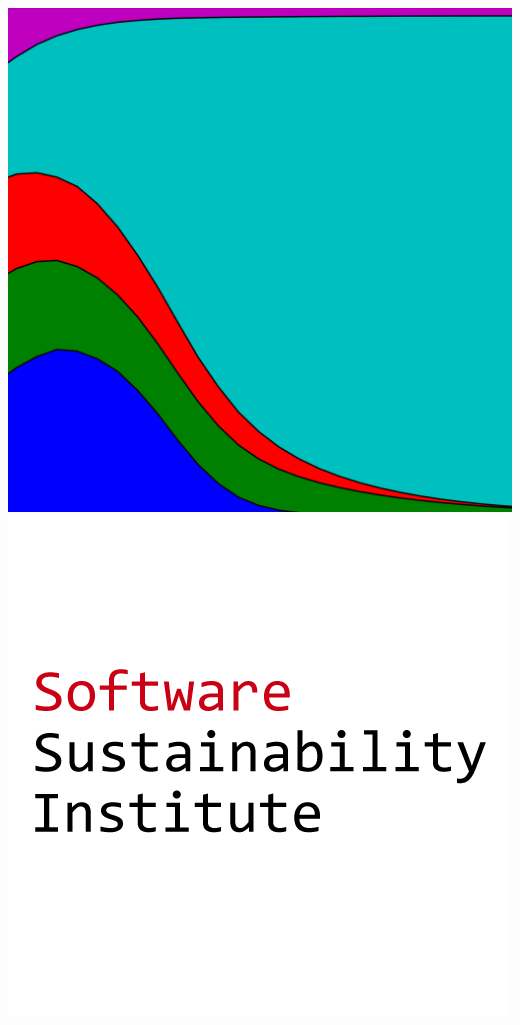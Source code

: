 \documentclass{beamer}
\begin{document}
\begin{frame}
        \includegraphics[height=.4\textheight]{static/axelrod_logo.png}
        \hfill
        \includegraphics[height=.4\textheight]{static/ssi-logo.png}
    \end{frame}
\end{document}

